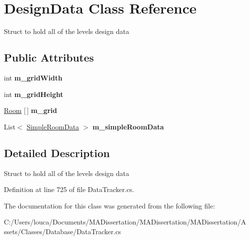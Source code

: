 \hypertarget{class_design_data}{}\section{Design\+Data Class Reference}
\label{class_design_data}


Struct to hold all of the level\textquotesingle{}s design data  


\subsection*{Public Attributes}
\begin{DoxyCompactItemize}
\item 
\mbox{\label{class_design_data_a882d498f174957395c3c723772a87932}} 
int {\bfseries m\+\_\+grid\+Width}
\item 
\mbox{\label{class_design_data_aeaa32e60c887ac657d79a1136a984ed1}} 
int {\bfseries m\+\_\+grid\+Height}
\item 
\mbox{\label{class_design_data_aa123d2da3927cfcea7a261e4cbf3bf35}} 
\mbox{\hyperlink{class_level_generation_1_1_room}{Room}} \mbox{[}$\,$\mbox{]} {\bfseries m\+\_\+grid}
\item 
\mbox{\label{class_design_data_aed539d15f4c07a46b7314403260d8736}} 
List$<$ \mbox{\hyperlink{struct_simple_room_data}{Simple\+Room\+Data}} $>$ {\bfseries m\+\_\+simple\+Room\+Data}
\end{DoxyCompactItemize}


\subsection{Detailed Description}
Struct to hold all of the level\textquotesingle{}s design data 



Definition at line 725 of file Data\+Tracker.\+cs.



The documentation for this class was generated from the following file\+:\begin{DoxyCompactItemize}
\item 
C\+:/\+Users/louca/\+Documents/\+M\+A\+Dissertation/\+M\+A\+Dissertation/\+M\+A\+Dissertation/\+Assets/\+Classes/\+Database/Data\+Tracker.\+cs\end{DoxyCompactItemize}
